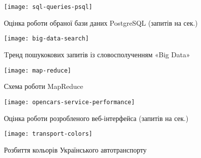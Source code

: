 \chapter{}

\begin{figure}[h]
\centering
\texttt{[image: sql-queries-psql]}
\caption{Оцінка роботи обраної бази даних PostgreSQL (запитів на сек.)}
\label{fig:sql-queries-psql}
\end{figure}

\begin{figure}[h]
\centering
\texttt{[image: big-data-search]}
\caption{Tренд пошукокових запитів із словосполученням «Big Data»}
\label{fig:big-data-search}
\end{figure}

\begin{figure}[h]
\centering
\texttt{[image: map-reduce]}
\caption{Схема роботи MapReduce}
\label{fig:map-reduce}
\end{figure}

\begin{figure}[h]
\centering
\texttt{[image: opencars-service-performance]}
\caption{Оцінка роботи розробленого веб-інтерфейса (запитів на сек.)}
\label{fig:opencars-service-performance}
\end{figure}

\begin{figure}[h]
\centering
\texttt{[image: transport-colors]}
\caption{Розбиття кольорів Українського автотранспорту}
\label{fig:transport-colors}
\end{figure}

